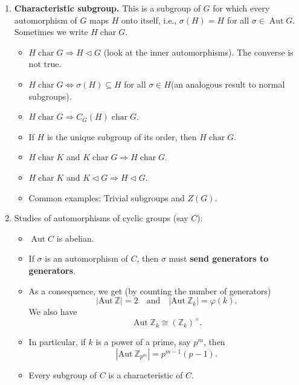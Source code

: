 \begin{enumerate}[(1)]
	\item \textbf{Characteristic subgroup.} This is a subgroup of $G$ for which every automorphism of $G$ maps $H$ onto itself, i.e., $\sigma(H) = H$ for all $\sigma \in \operatorname{Aut}G$. Sometimes we write $H\operatorname{char} G$.
	\begin{itemize}
		\item $H\operatorname{char}G \Rightarrow H\lhd G$ (look at the inner automorphisms). The converse is not true.
		\item $H\operatorname{char} G \Leftrightarrow \sigma(H)\subseteq H$ for all $\sigma \in H$(an analogous result to normal subgroups).
		\item $H\operatorname{char} G\Rightarrow C_G(H)\operatorname{char} G$.
		\item If $H$ is the unique subgroup of its order, then $H\operatorname{char} G$.
		\item $H\operatorname{char}K$ and $K\operatorname{char} G\Rightarrow H\operatorname{char}G$.
		\item $H\operatorname{char}K$ and $K\lhd G\Rightarrow H\lhd G$.
		\item Common examples: Trivial subgroups and $Z(G)$.
	\end{itemize}

\item Studies of automorphisms of cyclic groups (say $C$):
\begin{itemize}
	\item $\operatorname{Aut} C$ is abelian.
	\item If $\sigma$ is an automorphism of $C$, then $\sigma$ must \textbf{send generators to generators}.
	\item As a consequence, we get (by  counting the number of generators) $$|\text{Aut} ~\mathbb{Z}| = 2\quad \text{and}\quad  |\text{Aut} ~\mathbb{Z}_k| = \varphi(k).$$ 
	We also have
	\begin{equation*}
		\operatorname{Aut}\mathbb{Z}_k \cong (\mathbb{Z}_k)^{\times}.
	\end{equation*}
	\item In particular, if $k$ is a power of a prime, say $p^m$, then $$|\text{Aut} ~\mathbb{Z}_{p^m}| = p^{m-1}(p-1).$$
	\item Every subgroup of $C$ is a characteristic of $C$.
\end{itemize}
\end{enumerate}